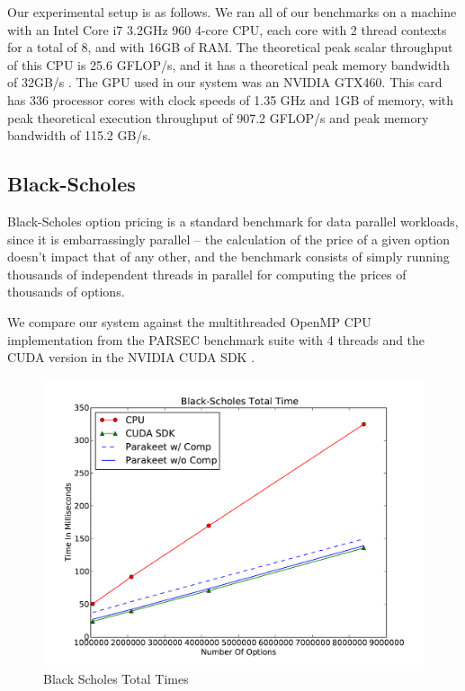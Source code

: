 \documentclass[preprint]{sigplanconf}
\begin{document}
Our experimental setup is as follows.  We ran all of our benchmarks on a machine with an Intel Core i7 3.2GHz 960 4-core CPU, each core with 2 thread contexts for a total of 8, and with 16GB of RAM.  The theoretical peak scalar throughput of this CPU is 25.6 GFLOP/s, and it has a theoretical peak memory bandwidth of 32GB/s \cite{Lee10}.  The GPU used in our system was an NVIDIA GTX460. This card has 336 processor cores with clock speeds of 1.35 GHz and 1GB of memory, with peak theoretical execution throughput of 907.2 GFLOP/s and peak memory bandwidth of 115.2 GB/s.

\subsection{Black-Scholes}
\label{results-bs}

Black-Scholes option pricing \cite{Blac73} is a standard benchmark for data parallel workloads, since it is embarrassingly parallel -- the calculation of the price of a given option doesn't impact that of any other, and the benchmark consists of simply running thousands of independent threads in parallel for computing the prices of thousands of options.

We compare our system against the multithreaded OpenMP CPU implementation from the PARSEC \cite{Bien08} benchmark suite with 4 threads and the CUDA version in the NVIDIA CUDA SDK \cite{NvidSD}.

\begin{figure}
\includegraphics[scale=0.45]{BSTotal.pdf}
\caption{Black Scholes Total Times}
\label{BSResults}
\end{figure}
\end{document}
